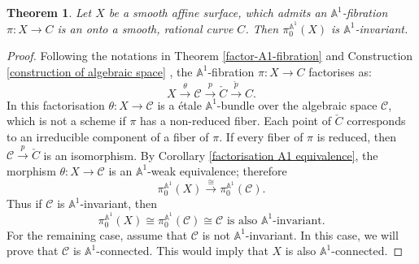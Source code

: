 \documentclass[11pt, reqno]{amsart}
\theoremstyle{plain}
\newtheorem{theorem}[thm]{Theorem}
\theoremstyle{definition}
\newcommand{\sC}{{\mathcal C}}
\newcommand{\A}{{\mathbb A}}
\begin{document}
			\begin{theorem}\label{connected-base-new}
            Let $X$ be a smooth affine surface, which admits an $\A^1$-fibration
$\pi: X \rightarrow C$ is an onto a smooth, rational curve $C$. Then $\pi_0^{\A^1}(X)$ is $\A^1$-invariant.
			\end{theorem}
		\begin{proof}
			Following the notations in Theorem \ref{factor-A1-fibration} and Construction \ref{construction of algebraic space}
            , the $\mathbb{A}^1$-fibration $\pi:X \to C$ factorises as:
			$$X \xrightarrow{\theta} \mathcal{C} \xrightarrow{p} \check{C} \xrightarrow{\check{p}}C.$$ 
			In this factorisation $\theta:X\to\sC$ is a \'etale $\A^1$-bundle over the algebraic space $\sC$, which is not a scheme if $\pi$ has a non-reduced fiber. Each point of $\check{C}$ corresponds to an irreducible component of a fiber of $\pi$. 
            If every fiber of $\pi$ is reduced, then $\sC\xrightarrow{p}\check{C}$ is an isomorphism.
			By Corollary \ref{factorisation A1 equivalence}, the morphism $\theta: X \to \mathcal{C}$ is an $\mathbb{A}^1$-weak equivalence; therefore 
			$$\pi_0^{\mathbb{A}^1}(X) \xrightarrow{\cong} \pi_0^{\mathbb{A}^1}(\mathcal{C}).$$
			Thus if $\sC$ is $\A^1$-invariant, then 
			$$\pi_0^{\mathbb{A}^1}(X) \cong \pi_0^{\A^1}(\sC) \cong \sC \text{ is also } \A^1 \text{-invariant}.$$ 
			For the remaining case, assume that $\sC$ is not $\A^1$-invariant. In this case, we will prove that $\mathcal{C}$ is $\mathbb{A}^1$-connected. This would imply that $X$ is also $\mathbb{A}^1$-connected.


\end{proof}
\end{document}
